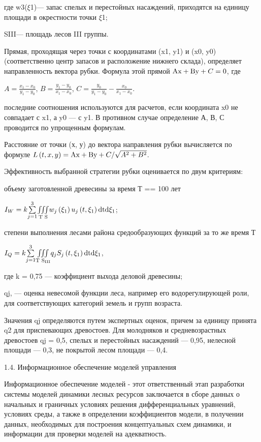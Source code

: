 \documentclass{report}
\newcommand\normalsubformula[1]{\text{\mathversion{normal}$#1$}}
\begin{document}
где w3($\xi $1)— запас спелых и перестойных насаждений, приходя\-тся на единицу площади в окрестности точки ${\xi}$1;

SIII— площадь лесов III группы.

Прямая, проходящая через точки с координатами (x1, y1) и (x0, y0) (соответственно центр запасов и расположение нижнего
склада), определяет направленность вектора рубки. Формула этой прямой 
$\normalsubformula{\text{Ax}}+\normalsubformula{\text{By}}+C=0$, где

 $A=\frac{x_1-x_0}{y_1-y_0}$,  $B=\frac{y_1-y_0}{x_1-x_0}$,  $C=\frac{y_0}{y_1-y_0}-\frac{x_0}{x_1-x_0}$.

последние соотношения используются для расчетов, если коорди\-ната x0 не совпадает с x1, а y0  — с y1. В противном
случае опреде\-ление А, В, С проводится по упрощенным формулам.

Расстояние от точки (х, у) до вектора направления рубки вы\-числяется по формуле 
$L\left(t,x,y\right)=\normalsubformula{\text{Ax}}+\normalsubformula{\text{By}}+C/\sqrt{A^2+B^2}$.

Эффективность выбранной стратегии рубки оценивается по двум критериям:

объему заготовленной древесины за время Т == 100 лет

 $I_W=k\overset 3{\underset{j=1}{\sum }}\underset{\text{T   S}}{\iiint }w_j\left(\xi _1\right)u_j\left(t,\xi
_1\right)\normalsubformula{\text{dtd}}\xi _1$;

степени выполнения лесами района средообразующих функ\-ций за то же время Т

 $I_Q=k\overset 3{\underset{j=1}{\sum }}\underset{\text{T S}_{\text{III}}}{\iiint }q_jS_j\left(t,\xi
_1\right)\normalsubformula{\text{dtd}}\xi _1$,

где k = 0,75 — коэффициент выхода деловой древесины;

qj, — оценка невесомой функции леса, например его водорегулирующей роли, для соответствующих категорий земель и групп
возраста.

Значения qj определяются путем экспертных оценок, причем за единицу принята q2  для приспевающих древостоев. Для
молодняков и средневозрастных древостоев qj  = 0,5, спелых и пере\-стойных насаждений — 0,95, нелесной площади — 0,3,
не покры\-той лесом площади — 0,4.

1.4. Информационное обеспечение моделей управления

Информационное обеспечение моделей - этот ответственный этап разработки системы моделей динамики лесных ресурсов
заключа\-ется в сборе данных о начальных и граничных условиях решения дифференциальных уравнений, условиях среды, а
также в опреде\-лении коэффициентов модели, в получении данных, необходимых для построения концептуальных схем
динамики, и информации для проверки моделей на адекватность.
\end{document}
